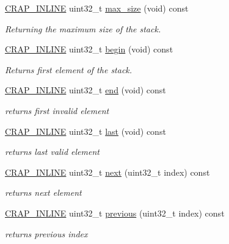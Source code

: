 \begin{DoxyCompactItemize}
\hyperlink{config__x86_8h_a5a40526b8d842e7ff731509998bb0f1c}{C\+R\+A\+P\+\_\+\+I\+N\+L\+I\+N\+E} uint32\+\_\+t \hyperlink{classcrap_1_1stack_ad0bb30c1014b7b4a7bbf1841d1481c18}{max\+\_\+size} (void) const 
\begin{DoxyCompactList}\small\item\em Returning the maximum size of the stack. \end{DoxyCompactList}\item 
\hyperlink{config__x86_8h_a5a40526b8d842e7ff731509998bb0f1c}{C\+R\+A\+P\+\_\+\+I\+N\+L\+I\+N\+E} uint32\+\_\+t \hyperlink{classcrap_1_1stack_a9c2f7303839f88c80c1f0ed6a2991b0a}{begin} (void) const 
\begin{DoxyCompactList}\small\item\em Returns first element of the stack. \end{DoxyCompactList}\item 
\hyperlink{config__x86_8h_a5a40526b8d842e7ff731509998bb0f1c}{C\+R\+A\+P\+\_\+\+I\+N\+L\+I\+N\+E} uint32\+\_\+t \hyperlink{classcrap_1_1stack_a2a380ae9fc3cc77cba66c57b262f222a}{end} (void) const 
\begin{DoxyCompactList}\small\item\em returns first invalid element \end{DoxyCompactList}\item 
\hyperlink{config__x86_8h_a5a40526b8d842e7ff731509998bb0f1c}{C\+R\+A\+P\+\_\+\+I\+N\+L\+I\+N\+E} uint32\+\_\+t \hyperlink{classcrap_1_1stack_a370528e5830a0d5a65736148a631399b}{last} (void) const 
\begin{DoxyCompactList}\small\item\em returns last valid element \end{DoxyCompactList}\item 
\hyperlink{config__x86_8h_a5a40526b8d842e7ff731509998bb0f1c}{C\+R\+A\+P\+\_\+\+I\+N\+L\+I\+N\+E} uint32\+\_\+t \hyperlink{classcrap_1_1stack_a7621682c6286562ded33719e7dc901e2}{next} (uint32\+\_\+t index) const 
\begin{DoxyCompactList}\small\item\em returns next element \end{DoxyCompactList}\item 
\hyperlink{config__x86_8h_a5a40526b8d842e7ff731509998bb0f1c}{C\+R\+A\+P\+\_\+\+I\+N\+L\+I\+N\+E} uint32\+\_\+t \hyperlink{classcrap_1_1stack_ad93bfb77e5c2d78ab5115e759172ed80}{previous} (uint32\+\_\+t index) const 
\begin{DoxyCompactList}\small\item\em returns previous index \end{DoxyCompactList}\item 

\end{DoxyCompactItemize}
